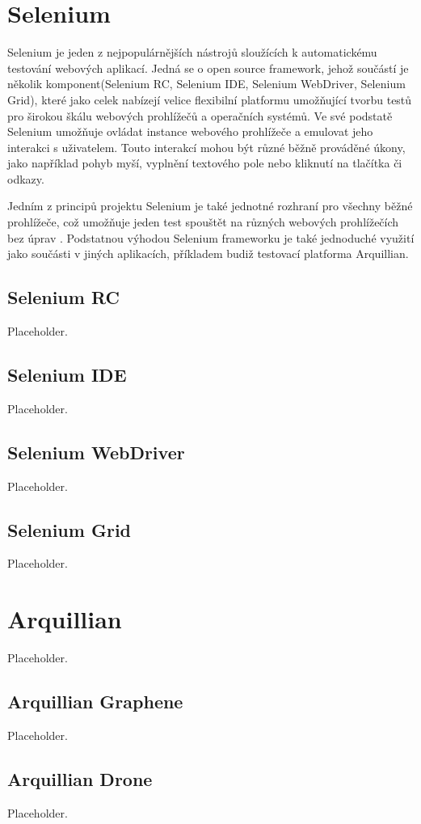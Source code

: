 \documentclass[
    color,   %
	table,   %
    twoside, %
]{fithesis3}
\begin{document}
  \section{Selenium}
 Selenium je jeden z nejpopulárnějších nástrojů sloužících k automatickému testování webových aplikací.   Jedná se o open source framework, jehož součástí je několik komponent(Selenium RC, Selenium IDE, Selenium WebDriver, Selenium Grid), které jako celek nabízejí velice flexibilní platformu umožňující tvorbu testů pro širokou škálu webových prohlížečů a operačních systémů. Ve své podstatě Selenium umožňuje ovládat instance webového prohlížeče a emulovat jeho interakci s uživatelem. Touto interakcí mohou být různé běžně prováděné úkony, jako například pohyb myší, vyplnění textového pole nebo kliknutí na tlačítka či odkazy. 

Jedním z principů projektu Selenium je také jednotné rozhraní pro všechny běžné prohlížeče, což umožňuje jeden test spouštět na různých webových prohlížečích bez úprav \cite{SeleniumGithub}. Podstatnou výhodou Selenium frameworku je také jednoduché využití jako součásti v jiných aplikacích, příkladem budiž testovací platforma Arquillian.
   \subsection{Selenium RC}
    Placeholder.
  \subsection{Selenium IDE}
  Placeholder.
  \subsection{Selenium WebDriver}
    Placeholder.
  \subsection{Selenium Grid}
    Placeholder.
  \section{Arquillian}
    Placeholder.
  \subsection{Arquillian Graphene}
    Placeholder.
  \subsection{Arquillian Drone}
    Placeholder.
\end{document}

